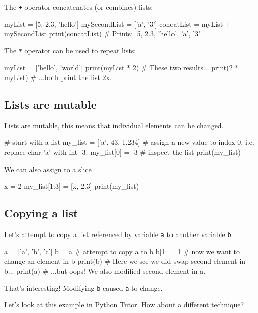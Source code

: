 \documentclass[12pt]{article} \newif\ifsolution\solutiontrue %
\begin{document}
The \texttt{+} operator concatenates (or combines) lists:

\begin{python}
myList = [5, 2.3, 'hello']
mySecondList = ['a', '3']
concatList = myList + mySecondList
print(concatList)  # Prints: [5, 2.3, 'hello', 'a', '3']
\end{python}

The \texttt{*} operator can be used to repeat lists:

\begin{python}
myList = ['hello', 'world']
print(myList * 2)  # These two results...
print(2 * myList)  # ...both print the list 2x.
\end{python}

\subsection{Lists are mutable}\label{lists-are-mutable}

Lists are mutable, this means that individual elements can be changed.

\begin{python}
# start with a list
my_list = ['a', 43, 1.234]
# assign a new value to index 0, i.e. replace char 'a' with int -3.
my_list[0] = -3
# inspect the list
print(my_list)
\end{python}

We can also assign to a slice

\begin{python}
x = 2
my_list[1:3] = [x, 2.3]
print(my_list)
\end{python}

\subsection{Copying a list}\label{copying-a-list}

Let's attempt to copy a list referenced by variable \texttt{a} to
another variable \texttt{b}:

\begin{python}
a = ['a', 'b', 'c']
b = a     # attempt to copy a to b
b[1] = 1  # now we want to change an element in b
print(b)  # Here we see we did swap second element in b...
print(a)  # ...but oops! We also modified second element in a.
\end{python}

That's interesting! Modifying \texttt{b} caused \texttt{a} to change.

Let's look at this example in
\href{http://pythontutor.com/iframe-embed.html\#code=a+\%3D+\%5B'a',+'b',+'c'\%5D\%0Ab+\%3D+a+\%23+attempt+to+copy+a+to+b\%0Ab\%5B1\%5D+\%3D+1+\%23+now+we+want+to+change+an+element+in+b\%0Aprint(b\%29\%0Aprint(a\%29\%0A\&origin=opt-frontend.js\&cumulative=false\&heapPrimitives=false\&textReferences=false\&py=3\&rawInputLstJSON=\%5B\%5D\&curInstr=0\&codeDivWidth=350\&codeDivHeight=400}{Python
Tutor}. How about a different technique?
\end{document}
